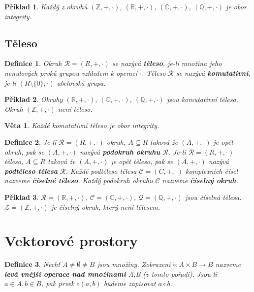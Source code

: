 \documentclass[12pt,a4paper]{article}
\newtheorem{definition}{Definice}
\newtheorem{sentence}{Věta}
\newtheorem{example}{Příklad}
\begin{document}
\begin{example}
	Každý z okruhů $(\mathbb{Z}, + , \cdot)$, $(\mathbb{R}, + , \cdot)$,  $(\mathbb{C}, + , \cdot)$, $(\mathbb{Q}, + , \cdot)$ je obor integrity.
\end{example}


\subsection{Těleso}
\begin{definition}
	Okruh $\mathscr{R} = (R,+,\cdot)$ se nazývá \textbf{těleso}, je-li množina jeho nenulových prvků grupou vzhledem k operaci $\cdot$. Těleso $\mathscr{R}$ se nazývá \textbf{komutativní}, je-li $(R \setminus \{0\}, \cdot)$ abelovská grupa.
\end{definition}

\begin{example}
	Okruhy  $(\mathbb{R}, + , \cdot)$,  $(\mathbb{C}, + , \cdot)$, $(\mathbb{Q}, + , \cdot)$ jsou komutativní tělesa. Okruh $(\mathbb{Z}, + , \cdot)$ není těleso.
\end{example}

\begin{sentence}
	Každé komutativní těleso je obor integrity.
\end{sentence}

\begin{definition}
	Je-li  $\mathscr{R} = (R,+,\cdot)$ okruh, $A \subseteq R$ taková že  $(A,+,\cdot)$ je opět okruh, pak se    $(A,+,\cdot)$ nazývá \textbf{podokruh okruhu} $\mathscr{R}$. Je-li  $\mathscr{R} = (R,+,\cdot)$ těleso, $A \subseteq R$ taková že  $(A,+,\cdot)$ je opět těleso, pak se $(A,+,\cdot)$ nazývá \textbf{podtěleso tělesa} $\mathscr{R}$. Každé podtěleso tělesa $\mathscr{C} = (C,+,\cdot)$  komplexních čísel nazveme \textbf{číselné těleso}. Každý podokruh okruhu  $\mathscr{C}$ nazveme \textbf{číselný okruh}.
\end{definition}

\begin{example}
	 $ \mathscr{R} = (\mathbb{R}, + , \cdot)$,  $\mathscr{C} = (\mathbb{C}, + , \cdot)$, $ \mathscr{Q} = (\mathbb{Q}, + , \cdot)$ jsou číselná tělesa. $\mathscr{Z} = (\mathbb{Z}, + , \cdot)$ je číselný okruh, který není tělesem.
\end{example}

\section{Vektorové prostory}
\begin{definition}
	Nechť $A \not= \emptyset \not= B$ jsou množiny. Zobrazení $\circ : A \times B \rightarrow B$ nazveme \textbf{levá vnější operace nad množinami} A,B (v tomto pořadí). Jsou-li $a \in A, b \in B$, pak prvek $\circ(a,b)$ budeme zapisovat $a \circ b$.
\end{definition}
\end{document}
